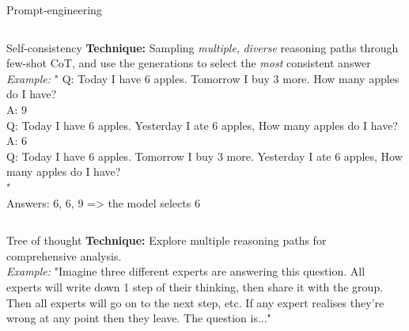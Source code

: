 \documentclass[presentation, 10pt]{beamer}\mode<presentation>{\usetheme{AMSBolognaFC}}
\begin{document}
\begin{frame}[allowframebreaks]{Prompt-engineering}
\begin{columns}
\begin{column}{0.2\textwidth}
\end{column}
\end{columns}
\framebreak

\begin{exampleblock}{Self-consistency}
\textbf{Technique:} Sampling \emph{multiple}, \emph{diverse} reasoning paths through few-shot CoT, and use the generations to select the \emph{most} consistent answer 
\emph{Example:} "
Q: Today I have 6 apples. Tomorrow I buy 3 more. How many apples do I have?\\
A: 9\\
Q: Today I have 6 apples. Yesterday I ate 6 apples, How many apples do I have?\\
A: 6\\
Q: Today I have 6 apples. Tomorrow I buy 3 more. Yesterday I ate 6 apples, How many apples do I have? \\
"\\
Answers: 6, 6, 9 => the model selects 6
\end{exampleblock}

\begin{columns}
	\begin{column}{0.6\textwidth}
		\begin{exampleblock}{Tree of thought}
			\textbf{Technique:} Explore multiple reasoning paths for comprehensive analysis. \\
			\emph{Example:} "Imagine three different experts are answering this question.
			All experts will write down 1 step of their thinking,
			then share it with the group.
			Then all experts will go on to the next step, etc.
			If any expert realises they're wrong at any point then they leave.
			The question is..."
			\end{exampleblock}
	\end{column}
	\begin{column}{0.35\textwidth}
	

\end{column}
\end{columns}
\end{frame}
\end{document}
